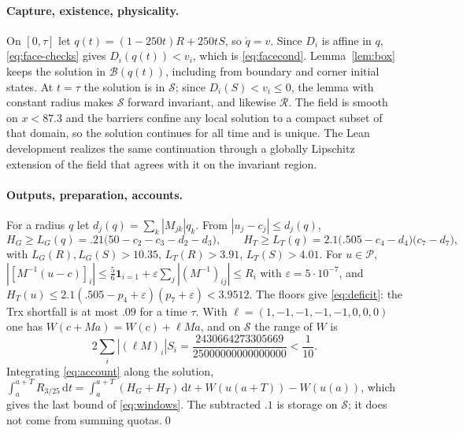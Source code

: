 \documentclass[11pt,a4paper]{article}
\theoremstyle{plain}
\theoremstyle{definition}
\theoremstyle{remark}
\newcommand{\dd}{\,\mathrm d}
\newcommand{\HG}{H_G}
\newcommand{\HT}{H_T}
\newcommand{\RR}{\mathcal R}
\newcommand{\SSS}{\mathcal S}
\newcommand{\Pp}{\mathcal P}
\begin{document}
\paragraph{Capture, existence, physicality.}
On $[0,\tau]$ let $q(t)=(1-250t)R+250tS$, so $\dot q=v$. Since $D_i$ is affine
in $q$, \eqref{eq:face-checks} gives $D_i(q(t))<v_i$, which is
\eqref{eq:facecond}. Lemma~\ref{lem:box} keeps the solution in
$\mathcal B(q(t))$, including from boundary and corner initial states. At
$t=\tau$ the solution is in $\SSS$; since $D_i(S)<v_i\le0$, the lemma with
constant radius makes $\SSS$ forward invariant, and likewise $\RR$. The field
is smooth on $x<87.3$ and the barriers confine any local solution to a compact
subset of that domain, so the solution continues for all time and is unique.
The Lean development realizes the same continuation through a globally
Lipschitz extension of the field that agrees with it on the invariant region.

\paragraph{Outputs, preparation, accounts.}
For a radius $q$ let $d_j(q)=\sum_k|M_{jk}|q_k$. From $|u_j-c_j|\le d_j(q)$,
\begin{equation}\label{eq:outputs}
\HG\ge L_G(q)=.21\bigl(50-c_2-c_3-d_2-d_3\bigr),\qquad
\HT\ge L_T(q)=2.1\bigl(.505-c_4-d_4\bigr)\bigl(c_7-d_7\bigr),
\end{equation}
with $L_G(R),L_G(S)>10.35$, $L_T(R)>3.91$, $L_T(S)>4.01$. For $u\in\Pp$,
$|[M^{-1}(u-c)]_i|\le\frac56\mathbf 1_{i=1}+\varepsilon\sum_j|(M^{-1})_{ij}|\le R_i$
with $\varepsilon=5\cdot10^{-7}$, and
$\HT(u)\le2.1(.505-p_4+\varepsilon)(p_7+\varepsilon)<3.9512$. The floors give
\eqref{eq:deficit}: the Trx shortfall is at most $.09$ for a time $\tau$. With
$\ell=(1,-1,-1,-1,-1,0,0,0)$ one has $W(c+Ma)=W(c)+\ell Ma$, and on $\SSS$
the range of $W$ is
\begin{equation}\label{eq:W-range}
2\sum_i|(\ell M)_i|S_i=\frac{2430664273305669}{25000000000000000}<\frac1{10}.
\end{equation}
Integrating \eqref{eq:account} along the solution,
$\int_a^{a+T}R_{3/25}\dd t=\int_a^{a+T}(\HG+\HT)\dd t+W(u(a+T))-W(u(a))$,
which gives the last bound of \eqref{eq:windows}. The subtracted $.1$ is
storage on $\SSS$; it does not come from summing quotas.\qed
\end{document}
